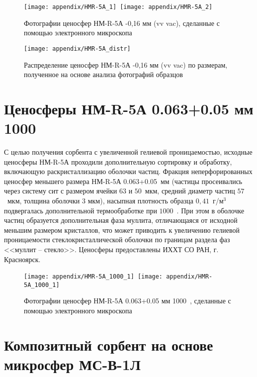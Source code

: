 \begin{figure}[h!]
	\centering
	\texttt{[image: appendix/HMR-5A\_1]}~\texttt{[image: appendix/HMR-5A\_2]}
	\caption{Фотографии ценосфер  НМ-R-5А -0,16 мм (vv vac), сделанные с помощью электронного микроскопа}
	\label{pic:HM-R-5A}  
\end{figure}

\newpage
\begin{figure}[h!]
	\centering
	\texttt{[image: appendix/HMR-5A\_distr]}
	\caption{Распределение ценосфер НМ-R-5А -0,16 мм (vv vac) по размерам, полученное на основе анализа фотографий образцов}
	\label{pic:HM-R-5A_distr}  
\end{figure}





\newpage
\section{Ценосферы НМ-R-5А 0.063+0.05 мм 1000~\textcelsius}

С целью получения сорбента с увеличенной гелиевой проницаемостью, исходные ценосферы НМ-R-5А проходили дополнительную сортировку и обработку, включающую раскристаллизацию оболочки частиц. Фракция неперфорированных ценосфер меньшего размера НМ-R-5А 0.063+0.05~мм (частицы просеивались через систему сит с размером ячейки $63$ и $50$~мкм, средний диаметр частиц $57$~мкм, толщина оболочки $3$ мкм), насыпная плотность образца $0,41$~г/м$^3$ подвергалась дополнительной термообработке при $1000$~\textcelsius. При этом в оболочке частиц образуется дополнительная фаза муллита, отличающаяся от исходной меньшим размером кристаллов, что может приводить к увеличению гелиевой проницаемости стеклокристаллической оболочки по границам раздела фаз <<муллит – стекло>>.  Ценосферы предоставлены ИХХТ СО РАН, г. Красноярск.


\begin{figure}[h!]
	\centering
	\texttt{[image: appendix/HMR-5A\_1000\_1]}~\texttt{[image: appendix/HMR-5A\_1000\_1]}
	\caption{Фотографии ценосфер  НМ-R-5А 0.063+0.05 мм 1000~\textcelsius, сделанные с помощью электронного микроскопа}
	\label{pic:HMR-5A_1000_1}  
\end{figure}

\newpage
\section{Композитный сорбент на основе микросфер МС-В-1Л}

